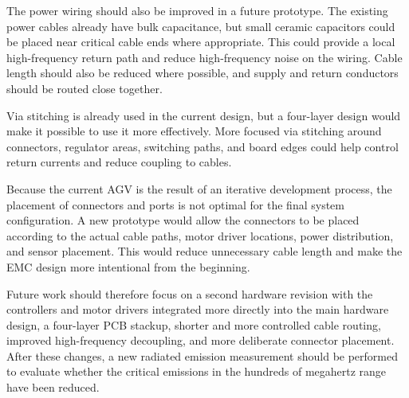 The power wiring should also be improved in a future prototype. The existing power
cables already have bulk capacitance, but small ceramic capacitors could be placed near
critical cable ends where appropriate. This could provide a local high-frequency return
path and reduce high-frequency noise on the wiring. Cable length should also be reduced
where possible, and supply and return conductors should be routed close together.

Via stitching is already used in the current design, but a four-layer design would make it
possible to use it more effectively. More focused via stitching around connectors,
regulator areas, switching paths, and board edges could help control return currents and
reduce coupling to cables.

Because the current AGV is the result of an iterative development process, the placement
of connectors and ports is not optimal for the final system configuration. A new prototype
would allow the connectors to be placed according to the actual cable paths, motor driver
locations, power distribution, and sensor placement. This would reduce unnecessary cable
length and make the EMC design more intentional from the beginning.

Future work should therefore focus on a second hardware revision with the controllers
and motor drivers integrated more directly into the main hardware design, a four-layer
PCB stackup, shorter and more controlled cable routing, improved high-frequency
decoupling, and more deliberate connector placement. After these changes, a new
radiated emission measurement should be performed to evaluate whether the critical
emissions in the hundreds of megahertz range have been reduced.